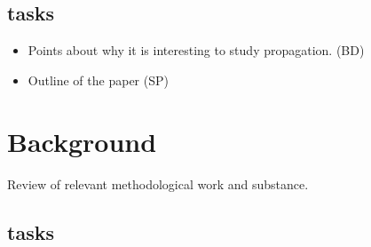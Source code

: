 \documentclass[12pt]{article}
\begin{document}
\subsection{tasks}
\begin{itemize}
\item Points about why it is interesting to study propagation. (BD)
\item Outline of the paper (SP)
\end{itemize}

\section{Background}

Review of relevant methodological work and substance.

\subsection{tasks}
\end{document}

